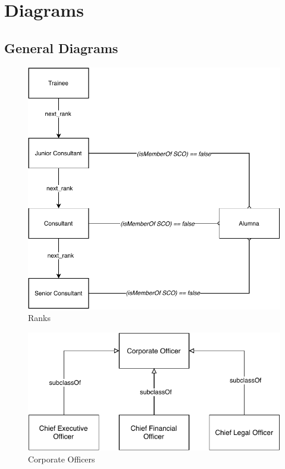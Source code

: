 \documentclass[a4paper, DIV=13, BCOR=0cm]{scrbook}
\begin{document}
\section{Diagrams}
\subsection{General Diagrams}
\begin{figure}[h]
	\caption{Ranks}
	\centering
	\includegraphics[width=\textwidth]{Diagrams/ranks.pdf}
\end{figure}

\begin{figure}[h]
	\caption{Corporate Officers}
	\centering
	\includegraphics[width=\textwidth]{Diagrams/corporate-officers.pdf}
\end{figure}
\end{document}
